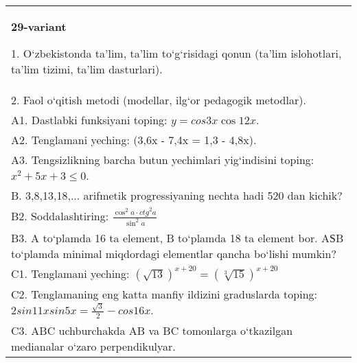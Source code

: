 \documentclass{article}
\begin{document}
\begin{tabular}{m{17cm}}
\textbf{29-variant}

1. O‘zbekistonda ta’lim, ta’lim to‘g‘risidagi qonun (ta’lim islohotlari, ta’lim tizimi, ta’lim dasturlari). \\
2. Faol o‘qitish metodi (modellar, ilg‘or pedagogik metodlar). \\
A1. Dastlabki funksiyani toping: \(y=cos{3x}\cos{12x}\). \\
A2. Tenglamani yeching: (3,6x - 7,4x = 1,3 - 4,8x). \\
A3. Tengsizlikning barcha butun yechimlari yig‘indisini toping: \(x^2 + 5x + 3 \leq 0\). \\
B. 3,8,13,18,... arifmetik progressiyaning nechta hadi 520 dan kichik? \\
B2. Soddalashtiring: \(\frac{\cos^{2}a \cdot {ctg}^{2}a}{\sin^{2}a}\) \\
B3. A to‘plamda 16 ta element, B to‘plamda 18 ta element bor. AЅB to‘plamda minimal miqdordagi elementlar qancha bo‘lishi mumkin? \\
C1. Tenglamani yeching: \((\sqrt{13}) ^{x + 20} = (\sqrt[3]{15}) ^{x + 20}\) \\
C2. Tenglamaning eng katta manfiy ildizini graduslarda toping: \(2sin11xsin5x = \frac{\sqrt{3}}{2} - cos16x\). \\
C3. ABC uchburchakda AB va BC tomonlarga o‘tkazilgan medianalar o‘zaro perpendikulyar. \\

\end{tabular}
\vspace{1cm}
\end{document}
